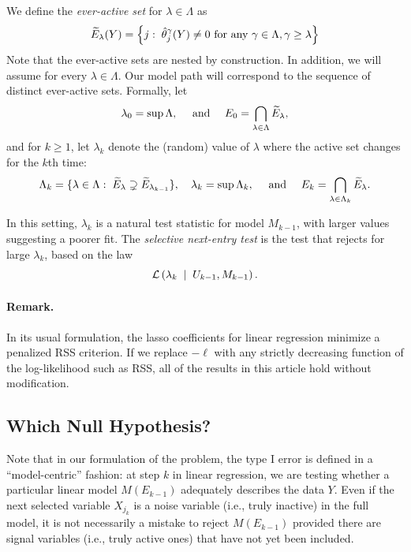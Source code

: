 \documentclass{article}
\begin{document}
We define the {\em ever-active set} for $\lambda\in\Lambda$ as
\begin{equation}
  \widetilde{E}_\lambda(Y) = \left\{j:\; \hat\theta_j^\gamma(Y) \neq 0 
    \text{ for any } \gamma\in \Lambda, \gamma \geq \lambda \right\}
\end{equation}
Note that the ever-active sets \smash{$\tE_\lambda$} are nested by construction. In addition, we will assume \smash{$|\tE_\lambda|<\infty$} for every $\lambda\in\Lambda$. Our model path will correspond to the sequence of distinct ever-active sets. Formally, let 
\[
\lambda_0=\sup \Lambda, \quad \text{ and } \quad 
E_0 = \bigcap_{\lambda\in \Lambda} \widetilde{E}_\lambda,
\]
and for $k\geq 1$, let $\lambda_k$ denote the (random) value of $\lambda$ where the active set changes for the $k$th time:
\begin{equation*}
  \Lambda_k = \{\lambda\in \Lambda:\; \widetilde{E}_\lambda \supsetneq \widetilde{E}_{\lambda_{k-1}}\},
  \quad
  \lambda_k = \sup\Lambda_k,
  \quad \text{ and } \quad
  E_k = \bigcap_{\lambda\in\Lambda_k} \widetilde{E}_{\lambda}.
\end{equation*}

In this setting, $\lambda_k$ is a natural test statistic for model $M_{k-1}$, with larger values suggesting a poorer fit. The {\em selective next-entry test} is the test that rejects for large $\lambda_k$, based on the law
\begin{equation*}
\mathcal{L}\left(\lambda_k \;\mid\; U_{k-1}, M_{k-1}\right).
\end{equation*}

\paragraph{Remark.} In its usual formulation, the lasso coefficients for linear regression minimize a penalized RSS criterion. If we replace $-\ell$ with any strictly decreasing function of the log-likelihood such as RSS, all of the results in this article hold without modification.


\subsection{Which Null Hypothesis?}
\label{sec:whichnull}

Note that in our formulation of the problem, the type I error  is defined in a ``model-centric'' fashion: at step $k$ in linear regression, we are testing  whether a particular linear model $M(E_{k-1})$ adequately describes the data $Y$. Even if the next selected variable $X_{j_k}$ is a noise variable (i.e., truly inactive) in the full model, it is not necessarily a mistake to reject $M(E_{k-1})$ provided there are signal variables (i.e., truly active ones) that have not yet been included.
\end{document}
